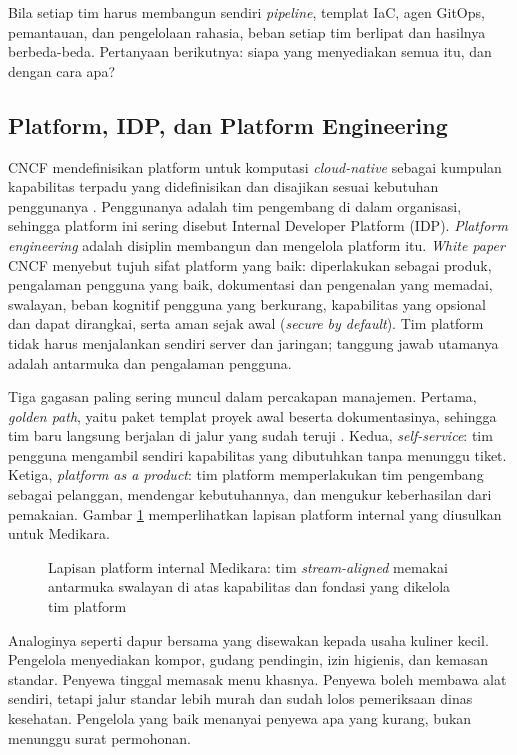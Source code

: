 Bila setiap tim harus membangun sendiri \textit{pipeline}, templat IaC, agen GitOps, pemantauan,
dan pengelolaan rahasia, beban setiap tim berlipat dan hasilnya berbeda-beda. Pertanyaan
berikutnya: siapa yang menyediakan semua itu, dan dengan cara apa?

\subsection{Platform, IDP, dan Platform Engineering}

CNCF mendefinisikan platform untuk komputasi \textit{cloud-native} sebagai kumpulan kapabilitas
terpadu yang didefinisikan dan disajikan sesuai kebutuhan penggunanya \cite{cncf-platforms}.
Penggunanya adalah tim pengembang di dalam organisasi, sehingga platform ini sering disebut
Internal Developer Platform (IDP). \textit{Platform engineering} adalah disiplin membangun dan
mengelola platform itu. \textit{White paper} CNCF menyebut tujuh sifat platform yang baik:
diperlakukan sebagai produk, pengalaman pengguna yang baik, dokumentasi dan pengenalan yang
memadai, swalayan, beban kognitif pengguna yang berkurang, kapabilitas yang opsional dan dapat
dirangkai, serta aman sejak awal (\textit{secure by default}). Tim platform tidak harus menjalankan
sendiri server dan jaringan; tanggung jawab utamanya adalah antarmuka dan pengalaman pengguna.

Tiga gagasan paling sering muncul dalam percakapan manajemen. Pertama, \textit{golden path}, yaitu
paket templat proyek awal beserta dokumentasinya, sehingga tim baru langsung berjalan di jalur yang
sudah teruji \cite{cncf-platforms}. Kedua, \textit{self-service}: tim pengguna mengambil sendiri
kapabilitas yang dibutuhkan tanpa menunggu tiket. Ketiga, \textit{platform as a product}: tim
platform memperlakukan tim pengembang sebagai pelanggan, mendengar kebutuhannya, dan mengukur
keberhasilan dari pemakaian. Gambar \ref{fig:ch13-platform} memperlihatkan lapisan platform
internal yang diusulkan untuk Medikara.

\begin{figure}[!htb]
  \centering
  
  \caption{Lapisan platform internal Medikara: tim \textit{stream-aligned} memakai antarmuka
           swalayan di atas kapabilitas dan fondasi yang dikelola tim platform}
  \label{fig:ch13-platform}
\end{figure}

Analoginya seperti dapur bersama yang disewakan kepada usaha kuliner kecil. Pengelola menyediakan
kompor, gudang pendingin, izin higienis, dan kemasan standar. Penyewa tinggal memasak menu
khasnya. Penyewa boleh membawa alat sendiri, tetapi jalur standar lebih murah dan sudah lolos
pemeriksaan dinas kesehatan. Pengelola yang baik menanyai penyewa apa yang kurang, bukan menunggu
surat permohonan.

